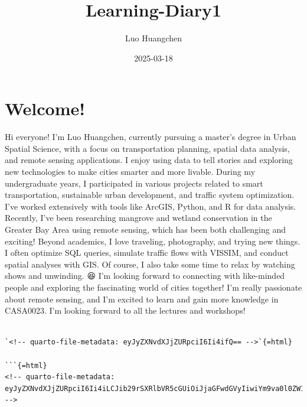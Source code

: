 \documentclass[
  letterpaper,
  DIV=11,
  numbers=noendperiod]{scrreprt}
\title{Learning-Diary1}
\author{Luo Huangchen}
\date{2025-03-18}
\renewcommand*\contentsname{Table of contents}
\newcommand\contentsname{Table of contents}
\begin{document}
\maketitle

\renewcommand*\contentsname{Table of contents}
{
\hypersetup{linkcolor=}
\setcounter{tocdepth}{2}
\tableofcontents
}


\chapter*{Welcome!}\label{welcome}


Hi everyone! I'm Luo Huangchen, currently pursuing a master's degree in
Urban Spatial Science, with a focus on transportation planning, spatial
data analysis, and remote sensing applications. I enjoy using data to
tell stories and exploring new technologies to make cities smarter and
more livable. During my undergraduate years, I participated in various
projects related to smart transportation, sustainable urban development,
and traffic system optimization. I've worked extensively with tools like
ArcGIS, Python, and R for data analysis. Recently, I've been researching
mangrove and wetland conservation in the Greater Bay Area using remote
sensing, which has been both challenging and exciting! Beyond academics,
I love traveling, photography, and trying new things. I often optimize
SQL queries, simulate traffic flows with VISSIM, and conduct spatial
analyses with GIS. Of course, I also take some time to relax by watching
shows and unwinding. 😆 I'm looking forward to connecting with
like-minded people and exploring the fascinating world of cities
together! I'm really passionate about remote sensing, and I'm excited to
learn and gain more knowledge in CASA0023. I'm looking forward to all
the lectures and workshops!

\begin{verbatim}

`<!-- quarto-file-metadata: eyJyZXNvdXJjZURpciI6Ii4ifQ== -->`{=html}

```{=html}
<!-- quarto-file-metadata: eyJyZXNvdXJjZURpciI6Ii4iLCJib29rSXRlbVR5cGUiOiJjaGFwdGVyIiwiYm9va0l0ZW1OdW1iZXIiOjEsImJvb2tJdGVtRmlsZSI6IldlZWsxLnFtZCIsImJvb2tJdGVtRGVwdGgiOjB9 -->
\end{verbatim}

\end{document}
